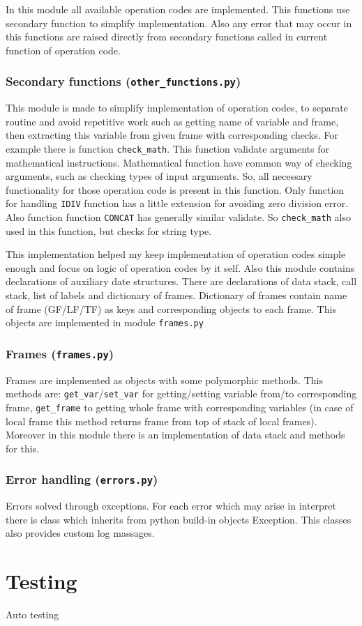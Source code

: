 \documentclass[10pt,a4paper]{article}
\begin{document}
In this module all available operation codes are implemented. This functions
use secondary function to simplify implementation. Also any error that may occur 
in this functions are raised directly from secondary functions called in current 
function of operation code.  

\subsubsection{Secondary functions (\texttt{other\_functions.py})}

This module is made to simplify implementation of operation codes, to separate 
routine and avoid repetitive work such as getting name of variable and frame, 
then extracting this variable from given frame with corresponding checks. For 
example there is function \texttt{check\_math}. This function validate arguments 
for mathematical instructions. Mathematical function have common way of checking 
arguments, such as checking types of input arguments. So, all necessary 
functionality for those operation code is present in this function. Only 
function for handling \texttt{IDIV} function has a little extension for avoiding 
zero division error. Also function function \texttt{CONCAT} has generally 
similar validate. So \texttt{check\_math} also used in this function, but checks 
for string type.

This implementation helped my keep implementation of operation codes simple enough 
and focus on logic of operation codes by it self. Also this module contains 
declarations of auxiliary  date structures. There are declarations of data stack, 
call stack, list of labels and dictionary of frames. Dictionary of frames 
contain name of frame (GF/LF/TF) as keys and corresponding  objects to each frame. 
This objects are implemented in module \texttt{frames.py}

\subsubsection{Frames (\texttt{frames.py})}

Frames are implemented as objects with some polymorphic methods. This methods are: 
\texttt{get\_var}/\texttt{set\_var} for getting/setting variable from/to 
corresponding frame, \texttt{get\_frame} to getting whole frame with corresponding 
variables (in case of local frame this method returns frame from top of stack of 
local frames). Moreover in this module there is an implementation of data stack 
and methods for this.

\subsubsection{Error handling (\texttt{errors.py})}
Errors solved through exceptions. For each error which may arise in interpret 
there is class which inherits from python build-in objects Exception. This 
classes also provides custom log massages.  

\section{Testing}

Auto testing 
\end{document}
